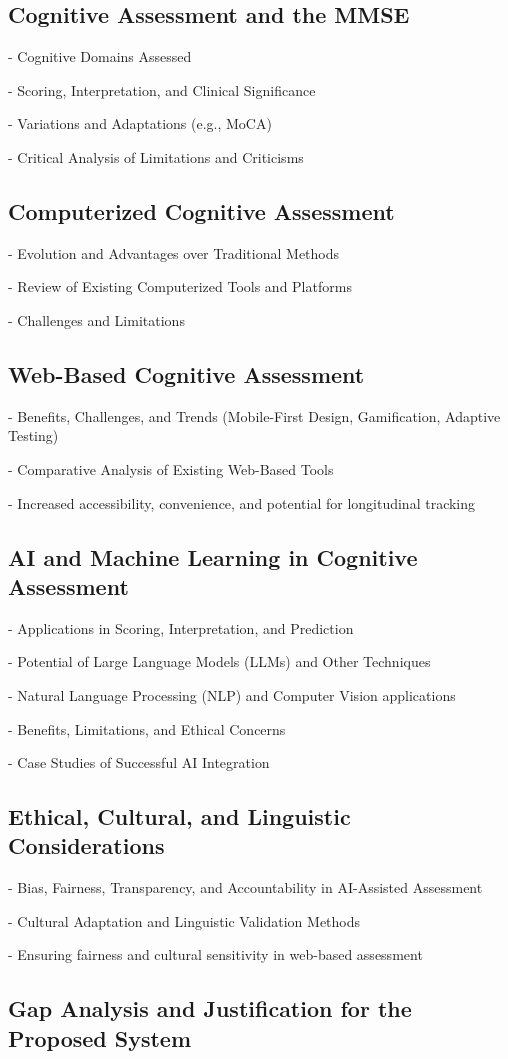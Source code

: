 
\subsection{Cognitive Assessment and the MMSE}
   - Cognitive Domains Assessed
   
   - Scoring, Interpretation, and Clinical Significance
   
   - Variations and Adaptations (e.g., MoCA)
   
   - Critical Analysis of Limitations and Criticisms
   

\subsection{Computerized Cognitive Assessment}

   - Evolution and Advantages over Traditional Methods
   
   - Review of Existing Computerized Tools and Platforms
   
   - Challenges and Limitations

\subsection{Web-Based Cognitive Assessment}
   - Benefits, Challenges, and Trends (Mobile-First Design, Gamification, Adaptive Testing)
   
   - Comparative Analysis of Existing Web-Based Tools
   
   - Increased accessibility, convenience, and potential for longitudinal tracking

\subsection{AI and Machine Learning in Cognitive Assessment}

   - Applications in Scoring, Interpretation, and Prediction
   
   - Potential of Large Language Models (LLMs) and Other Techniques
   
   - Natural Language Processing (NLP) and Computer Vision applications
   
   - Benefits, Limitations, and Ethical Concerns
   
   - Case Studies of Successful AI Integration

\subsection{Ethical, Cultural, and Linguistic Considerations}

   - Bias, Fairness, Transparency, and Accountability in AI-Assisted Assessment
   
   - Cultural Adaptation and Linguistic Validation Methods
   
   - Ensuring fairness and cultural sensitivity in web-based assessment

\subsection{Gap Analysis and Justification for the Proposed System}